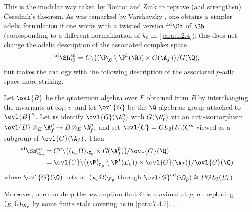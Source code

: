 \begin{para}\label{para:7.5.3}
 This is the modular way taken by Boutot and Zink to reprove (and
 strengthen) \v{C}erednik's theorem.  As was remarked by
 Varshavsky \cite[3.13]{varshavsky98:_shimur_ii}, one obtains a simpler adelic
 formulation if one works with a twisted version ${}^{\mathrm{ad}}\Sh$ of $\Sh$
 (corresponding to a different normalization of $h_0$ in \ref{para:1.2.4}); this
 does not change the adelic description of the associated complex space
 \begin{equation*}
  {}^{\mathrm{ad}}\Sh_\C^{\mathrm{an}}= C\backslash
   \bigl((\P_\C^1\setminus\P^1(\R)) \times G(\A_f)\bigr)/G(\Q),
 \end{equation*}
 but makes the analogy with the following description of the associated
 $p$-adic space more striking.
 

 Let $\ovl{B}$ be the quaternion algebra over $E$ obtained from $B$ by
 interchanging the invariants at $\infty_0, v$, and let $\ovl{G}$ be the
 $\Q$-algebraic group attached to $\ovl{B}^\times$. Let us identify
 $\ovl{G}(\A^p_f)$ with $G(\A^p_f)$ via an anti-isomorphism
 $\ovl{B}\otimes_E \A^p_f \rightarrow B\otimes_E \A^p_f ,$ and set
 $\ovl{C}=GL_2(E_v)C^p$ viewed as a subgroup of $\ovl{G}(\A_f)$.  Then
 \begin{align*}
  {}^{\mathrm{ad}}\Sh_{\C_p}^{\mathrm{an}} & =C^p \backslash
  \bigl((_{E_v}\Omega)_{\C_p}\times G(\A_f^p)\bigr)/{\ovl{G}}(\Q)\\
  & =\ovl{C}\backslash \bigl((\P^1_{\C_p}\setminus\P^1(E_v))\times
  \ovl{G}(\A_f)\bigr)/{\ovl{G}}(\Q)
 \end{align*}
 where ${\ovl{G}}(\Q)$ acts on $(_{E_v}\Omega)_{\C_p}$ through
 ${\ovl{G}}^{\mathrm{ad}}(\Q_p)\cong PGL_2(E_v)$.  

 Moreover, one can drop the assumption that $C$ is maximal at $p$, on
 replacing $(_{E_v}\Omega)_{\C_p}$ by some finite etale covering as in
 \ref{para:7.4.7}. \cite[3]{tpuosc}, \cite[5]{varshavsky98:_shimur_ii}.
\end{para}


